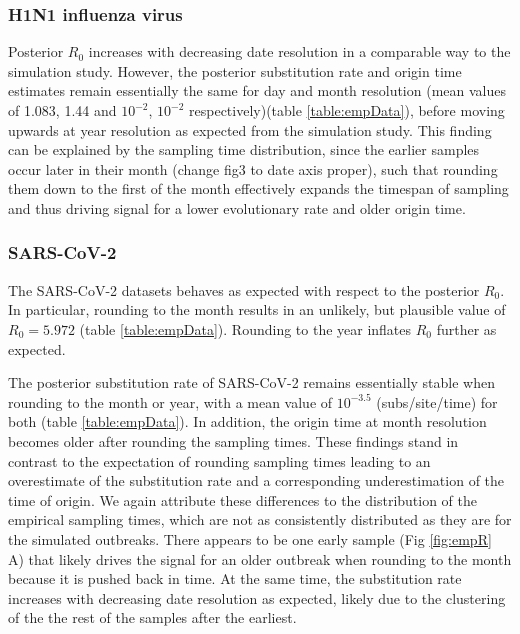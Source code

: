 \documentclass{article}
\begin{document}
\begin{spacing}{1.5}
\subsubsection*{H1N1 influenza virus}
Posterior $R_0$ increases with decreasing date resolution in a comparable way to the simulation study. However, the posterior substitution rate and origin time estimates remain essentially the same for day and month resolution (mean values of 1.083, 1.44 and $10^{-2}$, $10^{-2}$ respectively)(table \ref{table:empData}),  before moving upwards at year resolution as expected from the simulation study. This finding can be explained by the sampling time distribution, since the earlier samples occur later in their month (change fig3 to date axis proper), such that rounding them down to the first of the month effectively expands the timespan of sampling and thus driving signal for a lower evolutionary rate and older origin time.

\subsubsection*{SARS-CoV-2}
The SARS-CoV-2 datasets behaves as expected with respect to the posterior $R_0$. In particular, rounding to the month results in an unlikely, but plausible value of $R_0 = 5.972$ (table \ref{table:empData}). Rounding to the year inflates $R_0$ further as expected.

The posterior substitution rate of SARS-CoV-2 remains essentially stable when rounding to the month or year, with a mean value of $10^{-3.5}$ (subs/site/time) for both (table \ref{table:empData}). In addition, the origin time at month resolution becomes older after rounding the sampling times. These findings stand in contrast to the expectation of rounding sampling times leading to an overestimate of the substitution rate and a corresponding underestimation of the time of origin. We again attribute these differences to the distribution of the empirical sampling times, which are not as consistently distributed as they are for the simulated outbreaks. There appears to be one early sample (Fig \ref{fig:empR} A) that likely drives the signal for an older outbreak when rounding to the month because it is pushed back in time. At the same time, the substitution rate increases with decreasing date resolution as expected, likely due to the clustering of the the rest of the samples after the earliest.


\end{spacing}
\end{document}
